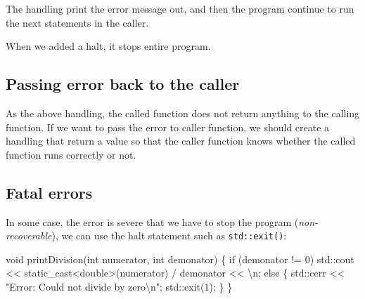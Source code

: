 \documentclass[
  letterpaper,
  DIV=11,
  numbers=noendperiod]{scrreprt}
\newenvironment{Shaded}{\begin{snugshade}}{\end{snugshade}}
\newcommand{\ControlFlowTok}[1]{\textcolor[rgb]{0.00,0.23,0.31}{#1}}
\newcommand{\DecValTok}[1]{\textcolor[rgb]{0.68,0.00,0.00}{#1}}
\newcommand{\ErrorTok}[1]{\textcolor[rgb]{0.68,0.00,0.00}{#1}}
\newcommand{\FunctionTok}[1]{\textcolor[rgb]{0.28,0.35,0.67}{#1}}
\newcommand{\NormalTok}[1]{\textcolor[rgb]{0.00,0.23,0.31}{#1}}
\newcommand{\SpecialCharTok}[1]{\textcolor[rgb]{0.37,0.37,0.37}{#1}}
\newcommand{\StringTok}[1]{\textcolor[rgb]{0.13,0.47,0.30}{#1}}
\begin{document}
\begin{tcolorbox}[enhanced jigsaw, toprule=.15mm, rightrule=.15mm, opacityback=0, breakable, leftrule=.75mm, colback=white, colframe=quarto-callout-note-color-frame, arc=.35mm, left=2mm, bottomrule=.15mm]
\begin{minipage}[t]{5.5mm}
\textcolor{quarto-callout-note-color}{\faInfo}
\end{minipage}%
\begin{minipage}[t]{\textwidth - 5.5mm}

The handling print the error message out, and then the program continue
to run the next statements in the caller.

When we added a halt, it stops entire program.

\end{minipage}%
\end{tcolorbox}

\hypertarget{passing-error-back-to-the-caller}{%
\subsection{Passing error back to the
caller}\label{passing-error-back-to-the-caller}}

As the above handling, the called function does not return anything to
the calling function. If we want to pass the error to caller function,
we should create a handling that return a value so that the caller
function knows whether the called function runs correctly or not.

\hypertarget{fatal-errors}{%
\subsection{Fatal errors}\label{fatal-errors}}

In some case, the error is severe that we have to stop the program
(\emph{non-recoverable}), we can use the halt statement such as
\texttt{std::exit()}:

\begin{Shaded}
\begin{Highlighting}[]
\NormalTok{void }\FunctionTok{printDivision}\NormalTok{(int numerator, int demonator)}
\NormalTok{\{}
    \ControlFlowTok{if}\NormalTok{ (demonator }\SpecialCharTok{!=} \DecValTok{0}\NormalTok{)}
\NormalTok{        std}\SpecialCharTok{::}\NormalTok{cout }\SpecialCharTok{\textless{}}\ErrorTok{\textless{}}\NormalTok{ static\_cast}\SpecialCharTok{\textless{}}\NormalTok{double}\SpecialCharTok{\textgreater{}}\NormalTok{(numerator) }\SpecialCharTok{/}\NormalTok{ demonator }\SpecialCharTok{\textless{}}\ErrorTok{\textless{}} \StringTok{\textquotesingle{}}\SpecialCharTok{\textbackslash{}n}\StringTok{\textquotesingle{}}\NormalTok{;}
    \ControlFlowTok{else}
\NormalTok{    \{}
\NormalTok{        std}\SpecialCharTok{::}\NormalTok{cerr }\SpecialCharTok{\textless{}}\ErrorTok{\textless{}} \StringTok{"Error: Could not divide by zero}\SpecialCharTok{\textbackslash{}n}\StringTok{"}\NormalTok{;}
\NormalTok{        std}\SpecialCharTok{::}\FunctionTok{exit}\NormalTok{(}\DecValTok{1}\NormalTok{);}
\NormalTok{    \}}
\NormalTok{\}}
\end{Highlighting}
\end{Shaded}
\end{document}
